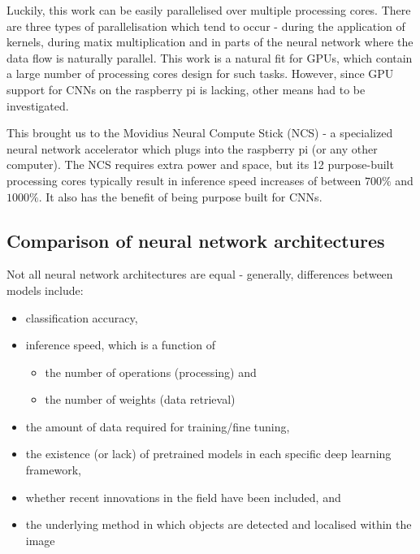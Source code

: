 
Luckily, this work can be easily parallelised over multiple processing cores. There are three types of parallelisation which tend to occur - during the application of kernels, during matix multiplication and in parts of the neural network where the data flow is naturally parallel. This work is a natural fit for GPUs, which contain a large number of processing cores design for such tasks. However, since GPU support for CNNs on the raspberry pi is lacking, other means had to be investigated.


This brought us to the Movidius Neural Compute Stick (NCS) - a specialized neural network accelerator which plugs into the raspberry pi (or any other computer). The NCS requires extra power and space, but its 12 purpose-built processing cores typically result in inference speed increases of between $700\%$ and $1000\%$. It also has the benefit of being purpose built for CNNs.


\subsection{Comparison of neural network architectures}
Not all neural network architectures are equal - generally, differences between models include:

\begin{itemize}
	\item classification accuracy,
	\item inference speed, which is a function of
	\begin{itemize}
		\item the number of operations (processing) and
		\item the number of weights (data retrieval)
	\end{itemize}
	\item the amount of data required for training/fine tuning,
	\item the existence (or lack) of pretrained models in each specific deep learning framework,
	\item whether recent innovations in the field have been included, and
	\item the underlying method in which objects are detected and localised within the image
\end{itemize}

